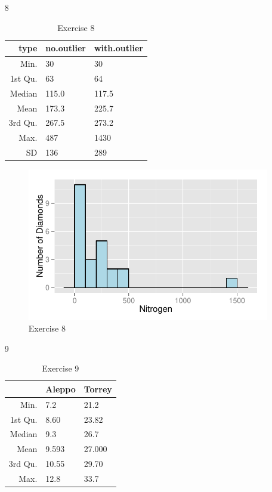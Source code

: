 \documentclass[landscape]{exam}
\begin{document}
\begin{enumerate}
    \item[8]
      \begin{table}[H]
        \centering
        \begin{tabular}{rll}
          \toprule
          type    & no.outlier & with.outlier \\
          \midrule
          Min.    & 30         & 30 \\
          1st Qu. & 63         & 64 \\
          Median  & 115.0      & 117.5 \\
          Mean    & 173.3      & 225.7 \\
          3rd Qu. & 267.5      & 273.2 \\
          Max.    & 487        & 1430 \\
          SD      & 136        & 289 \\
          \bottomrule
        \end{tabular}
        \caption{Exercise 8}
      \end{table}

      \begin{figure}[H]
        \centering
        \includegraphics[scale = 0.8]{figures/ex08.pdf}
        \caption{Exercise 8}
      \end{figure}

    \item[9]
      \begin{table}[H]
        \centering
        \begin{tabular}{rll}
          \toprule
                   & Aleppo & Torrey \\
          \midrule
          Min.     & 7.2    & 21.2 \\
          1st Qu.  & 8.60   & 23.82 \\
          Median   & 9.3    & 26.7 \\
          Mean     & 9.593  & 27.000 \\
          3rd Qu.  & 10.55  & 29.70 \\
          Max.     & 12.8   & 33.7 \\
          \bottomrule
        \end{tabular}
        \caption{Exercise 9}
      \end{table}


\end{enumerate}
\end{document}
